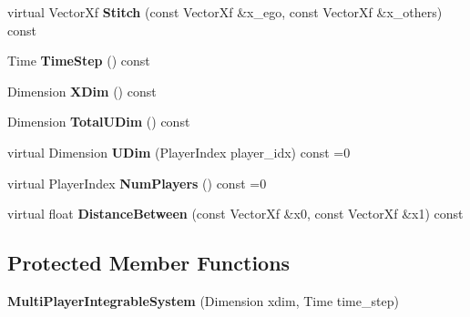 \begin{DoxyCompactItemize}
\item 
virtual Vector\+Xf {\bfseries Stitch} (const Vector\+Xf \&x\+\_\+ego, const Vector\+Xf \&x\+\_\+others) const \hypertarget{classilqgames_1_1_multi_player_integrable_system_a027ab5dea23c68ea74040a50a7b16c31}{}\label{classilqgames_1_1_multi_player_integrable_system_a027ab5dea23c68ea74040a50a7b16c31}

\item 
Time {\bfseries Time\+Step} () const \hypertarget{classilqgames_1_1_multi_player_integrable_system_a1dfd36e77c611fb9d72ba7d2f66dbc08}{}\label{classilqgames_1_1_multi_player_integrable_system_a1dfd36e77c611fb9d72ba7d2f66dbc08}

\item 
Dimension {\bfseries X\+Dim} () const \hypertarget{classilqgames_1_1_multi_player_integrable_system_a1f3d72304e04f6906e6e1066717411a7}{}\label{classilqgames_1_1_multi_player_integrable_system_a1f3d72304e04f6906e6e1066717411a7}

\item 
Dimension {\bfseries Total\+U\+Dim} () const \hypertarget{classilqgames_1_1_multi_player_integrable_system_ac6fc71106bffdff776a55792af4560d1}{}\label{classilqgames_1_1_multi_player_integrable_system_ac6fc71106bffdff776a55792af4560d1}

\item 
virtual Dimension {\bfseries U\+Dim} (Player\+Index player\+\_\+idx) const =0\hypertarget{classilqgames_1_1_multi_player_integrable_system_a89563d59d8cda88e0825992b86c9a146}{}\label{classilqgames_1_1_multi_player_integrable_system_a89563d59d8cda88e0825992b86c9a146}

\item 
virtual Player\+Index {\bfseries Num\+Players} () const =0\hypertarget{classilqgames_1_1_multi_player_integrable_system_a894daac1bf9f941718529e5a31b81a88}{}\label{classilqgames_1_1_multi_player_integrable_system_a894daac1bf9f941718529e5a31b81a88}

\item 
virtual float {\bfseries Distance\+Between} (const Vector\+Xf \&x0, const Vector\+Xf \&x1) const \hypertarget{classilqgames_1_1_multi_player_integrable_system_af25dee45970bc4e53a3844084bc3fad4}{}\label{classilqgames_1_1_multi_player_integrable_system_af25dee45970bc4e53a3844084bc3fad4}

\end{DoxyCompactItemize}
\subsection*{Protected Member Functions}
\begin{DoxyCompactItemize}
\item 
{\bfseries Multi\+Player\+Integrable\+System} (Dimension xdim, Time time\+\_\+step)\hypertarget{classilqgames_1_1_multi_player_integrable_system_a7b66a8aa057ed007006d884b5fe333af}{}\label{classilqgames_1_1_multi_player_integrable_system_a7b66a8aa057ed007006d884b5fe333af}

\end{DoxyCompactItemize}
